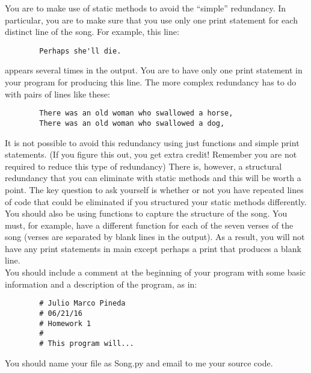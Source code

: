 \documentclass[12pt]{article}
\theoremstyle{definition}
\theoremstyle{definition}
\theoremstyle{remark}
\theoremstyle{remark}
\begin{document}
	\noindent
	You are to make use of static methods to avoid the “simple” redundancy.  In particular, you are to make sure that you use only one print statement for each distinct line of the song.  For example, this line:
	\begin{verbatim}
		Perhaps she'll die.
	\end{verbatim}
	appears several times in the output.  You are to have only one print statement in your program for producing this line.  The more complex redundancy has to do with pairs of lines like these:
	\begin{verbatim}
		There was an old woman who swallowed a horse,
		There was an old woman who swallowed a dog,
	\end{verbatim}
	It is not possible to avoid this redundancy using just functions and simple print statements. (If you figure this out, you get extra credit! Remember you are not required to reduce this type of redundancy)  There is, however, a structural redundancy that you can eliminate with static methods and this will be worth a point.  The key question to ask yourself is whether or not you have repeated lines of code that could be eliminated if you structured your static methods differently. \\
	
	\noindent
	You should also be using functions to capture the structure of the song.  You must, for example, have a different function for each of the seven verses of the song (verses are separated by blank lines in the output).  As a result, you will not have any print statements in main except perhaps a print that produces a blank line. \\
	
	\noindent
	You should include a comment at the beginning of your program with some basic information and a description of the program, as in:
	\begin{verbatim}
		# Julio Marco Pineda
		# 06/21/16
		# Homework 1
		#
		# This program will...
	\end{verbatim}
	\noindent
	You should name your file as Song.py and email to me your source code. \\
	
\end{document}
